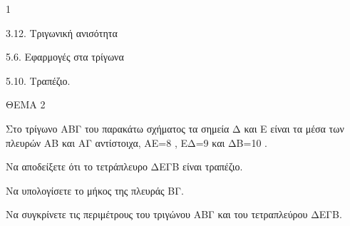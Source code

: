 \begin{ylh}{1}
    \item 3.12. Τριγωνική ανισότητα
    \item 5.6. Εφαρμογές στα τρίγωνα
    \item 5.10. Τραπέζιο.
\end{ylh}

ΘΕΜΑ 2

Στο τρίγωνο ΑΒΓ του παρακάτω σχήματος τα σημεία Δ και Ε είναι τα μέσα των πλευρών ΑΒ και ΑΓ αντίστοιχα, ΑE=8 , ΕΔ=9 και ΔΒ=10 .

\begin{alist}
\item Να αποδείξετε ότι το τετράπλευρο ΔΕΓΒ είναι τραπέζιο. 

\item Να υπολογίσετε το μήκος της πλευράς ΒΓ. 

\item Να συγκρίνετε τις περιμέτρους του τριγώνου ΑΒΓ και του τετραπλεύρου ΔΕΓΒ. 


\begin{center}
\end{center}
\end{alist}
